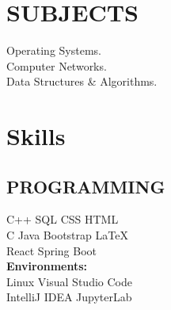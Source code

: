 \documentclass[]{essdee-resume}
\begin{document}
\begin{minipage}[t]{0.33\textwidth}
\section{SUBJECTS}
 

 \textbullet{} Operating Systems. \\
 \textbullet{} Computer Networks. \\
 \textbullet{} Data Structures \& Algorithms.  \\

\sectionsep



\section{Skills}
\subsection{PROGRAMMING}
 C++ \textbullet{} SQL \textbullet{} CSS \textbullet{} HTML \\
C \textbullet{} Java \textbullet{} Bootstrap  \textbullet{} \LaTeX\  \\
React \textbullet{} Spring Boot \\ 
\textbf{Environments:}\\
Linux \textbullet{} Visual Studio Code  \\
IntelliJ IDEA \textbullet{} JupyterLab
\sectionsep


\end{minipage}
\end{document}
